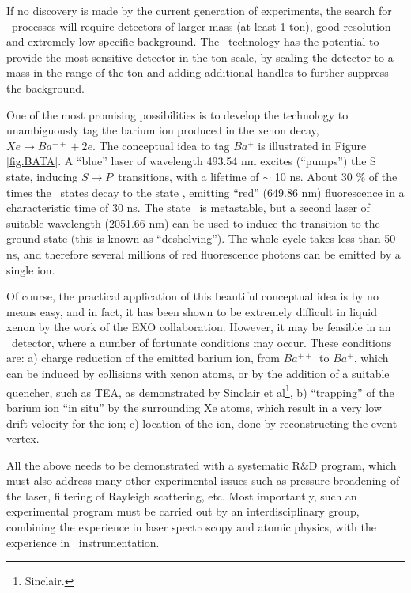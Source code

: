 \documentclass[a4paper,11pt,oneside]{article}
\begin{document}

If no discovery is made by the current generation of experiments, the search for \bbonu\ processes will require detectors of larger mass (at least 1 ton), good resolution and extremely low specific background. The \HPXE\ technology has the potential to provide the most sensitive detector in the ton scale, by scaling the detector to a mass in the range of the ton and adding additional handles to further suppress the background. 

One of the most promising possibilities is to develop the technology to unambiguously tag the barium ion produced in the xenon decay, $Xe \rightarrow Ba^{++} + 2 e$. The conceptual idea to tag $Ba^{+}$ is illustrated in Figure \ref{fig.BATA}. A ``blue'' laser of wavelength 493.54 nm excites (``pumps'') the S state, inducing $S \rightarrow P$~transitions, with a lifetime of $\sim$ 10 ns. About 30 \% of the times the \TwoP\ states decay to the state \TwoD, emitting ``red'' (649.86 nm) fluorescence in a characteristic time of 30 ns. The state \TwoD\ is metastable, but a second laser of suitable wavelength (2051.66 nm) can be used to induce the transition to the ground state (this is known as ``deshelving'').  The whole cycle takes less than 50 ns, and therefore several millions of red fluorescence photons can be emitted by a single ion. 

Of course, the practical application of this beautiful conceptual idea is by no means easy, and in fact, it has been shown to be extremely difficult in liquid xenon by the work of the EXO collaboration. However, it may be feasible in an \HPXE\ detector, where a number of fortunate conditions may occur. These conditions are: a) charge reduction of the emitted barium ion, from $Ba^{++}$~to $Ba^{+}$, which can be induced by collisions with xenon atoms, or by the addition of a suitable quencher, such as TEA, as demonstrated by Sinclair et al\footnote{Sinclair.}, b) ``trapping'' of the barium ion ``in situ'' by the surrounding Xe atoms, which result in a very low drift velocity for the ion; c) location of the ion, done by reconstructing the event vertex. 

All the above needs to be demonstrated with a systematic R\&D program, which must also address many other experimental issues such as pressure broadening of the laser, filtering of Rayleigh scattering, etc. Most importantly, such an experimental program must be carried out by an interdisciplinary group, combining the experience in laser spectroscopy and atomic physics, with the experience in \HPXE\ instrumentation.
\end{document}
